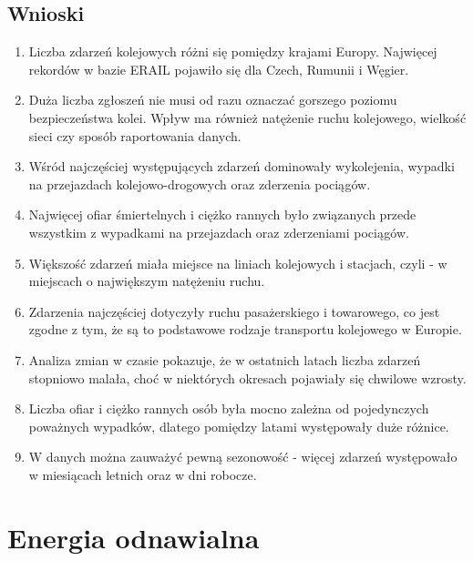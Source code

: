 \documentclass[12pt]{article}
\begin{document}
\subsection{Wnioski}
\begin{enumerate}
    \item Liczba zdarzeń kolejowych różni się pomiędzy krajami Europy. Najwięcej rekordów w bazie ERAIL pojawiło się dla Czech, Rumunii i Węgier.
    
    \item Duża liczba zgłoszeń nie musi od razu oznaczać gorszego poziomu bezpieczeństwa kolei. Wpływ ma również natężenie ruchu kolejowego, wielkość sieci czy sposób raportowania danych.
    
    \item Wśród najczęściej występujących zdarzeń dominowały wykolejenia, wypadki na przejazdach kolejowo-drogowych oraz zderzenia pociągów.
    
    \item Najwięcej ofiar śmiertelnych i ciężko rannych było związanych przede wszystkim z wypadkami na przejazdach oraz zderzeniami pociągów.
    
    \item Większość zdarzeń miała miejsce na liniach kolejowych i stacjach, czyli - w miejscach o największym natężeniu ruchu.
    
    \item Zdarzenia najczęściej dotyczyły ruchu pasażerskiego i towarowego, co jest zgodne z tym, że są to podstawowe rodzaje transportu kolejowego w Europie.
    
    \item Analiza zmian w czasie pokazuje, że w ostatnich latach liczba zdarzeń stopniowo malała, choć w niektórych okresach pojawiały się chwilowe wzrosty.
    
    \item Liczba ofiar i ciężko rannych osób była mocno zależna od pojedynczych poważnych wypadków, dlatego pomiędzy latami występowały duże różnice.
    
    \item W danych można zauważyć pewną sezonowość - więcej zdarzeń występowało w miesiącach letnich oraz w dni robocze.
\end{enumerate}


\newpage


\section{Energia odnawialna}
\end{document}

